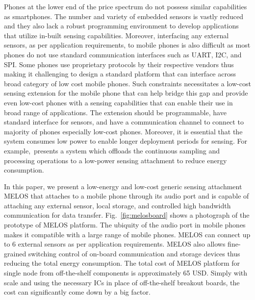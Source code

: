 \documentclass[10pt]{sigplan-proc-varsize}
\newcommand{\figref}[1]{Fig.~\ref{#1}}
\newcommand{\melos}{MELOS }
\begin{document}
Phones at the lower end of the price spectrum do not possess similar capabilities as smartphones. The number and variety of embedded sensors is vastly reduced and they also lack a robust programming environment to develop applications that utilize in-built sensing capabilities. Moreover, interfacing any external sensors, as per application requirements, to mobile phones is also difficult\cite{psi} as most phones do not use standard communication interfaces such as UART, I2C, and SPI. Some phones use proprietary protocols by their respective vendors thus making it challenging to design a standard platform that can interface across broad category of low cost mobile phones. Such constraints necessitates a low-cost sensing extension for the mobile phone that can help bridge this gap and provide even low-cost phones with a sensing capabilities that can enable their use in broad range of applications. The extension should be programmable, have standard interface for sensors, and have a communication channel to connect to majority of phones especially low-cost phones. Moreover, it is essential that the system consumes low power to enable longer deployment periods for sensing. For example,~\cite{littlerock}presents a system which offloads the continuous sampling and processing operations to a low-power sensing attachment to reduce energy consumption.

In this paper, we present a low-energy and low-cost generic sensing attachment \melos that attaches to a mobile phone through its audio port and is capable of attaching any external sensor, local storage, and controlled high bandwidth communication for data transfer. \figref{fig:melosboard} shows a photograph of the prototype of \melos platform. The ubiquity of the audio port in mobile phones makes it compatible with a large range of mobile phones. \melos can connect up to 6 external sensors as per application requirements. \melos also allows fine-grained switching control of on-board communication and storage devices thus reducing the total energy consumption. The total cost of \melos platform for single node from off-the-shelf components is approximately 65 USD. Simply with scale and using the necessary ICs in place of off-the-shelf breakout boards, the cost can significantly come down by a big factor. 

\end{document}
